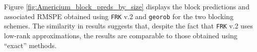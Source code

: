 \documentclass[12pt,a4paper]{article}
\begin{document}
Figure \ref{fig:Americium_block_preds_by_size} displays the block predictions and associated RMSPE obtained using \texttt{FRK} v.2 and \texttt{georob} for the two blocking schemes.
The similarity in results  
suggests that, despite the fact that \texttt{FRK} v.2 uses low-rank approximations, the results are comparable to those obtained using ``exact'' methods.




 














\end{document}
